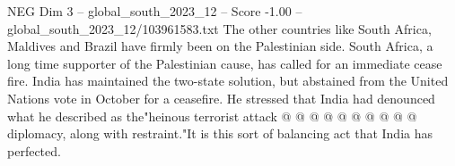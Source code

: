 \begin{textsample}{NEG Dim 3 – global\_south\_2023\_12 – Score -1.00 – global\_south\_2023\_12/103961583.txt}
The other countries like South Africa, Maldives and Brazil have firmly been on the Palestinian side.
South Africa, a long time supporter of the Palestinian cause, has called for an immediate cease fire.
India has maintained the two-state solution, but abstained from the United Nations vote in October for a ceasefire.
He stressed that India had denounced what he described as the"heinous terrorist attack @ @ @ @ @ @ @ @ @ @ diplomacy, along with restraint."It is this sort of balancing act that India has perfected.

\end{textsample}
